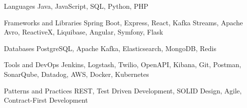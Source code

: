 
\begin{cvskills}

  \cvskill
    {Languages} %
    {Java, JavaScript, SQL, Python, PHP} %

  \cvskill
    {Frameworks and Libraries} %
    {Spring Boot, Express,  React, Kafka Streams, Apache Avro, ReactiveX,
    Liquibase, Angular, Symfony, Flask} %

  \cvskill
    {Databases} %
    {PostgreSQL, Apache Kafka, Elasticsearch, MongoDB, Redis} %

  \cvskill
    {Tools and DevOps} %
    {Jenkins, Logstash, Twilio, OpenAPI, Kibana, Git, Postman, SonarQube,
    Datadog, AWS, Docker, Kubernetes} %

  \cvskill
    {Patterns and Practices} %
    {REST, Test Driven Development, SOLID Design, Agile, Contract-First
    Development} %
\end{cvskills}
